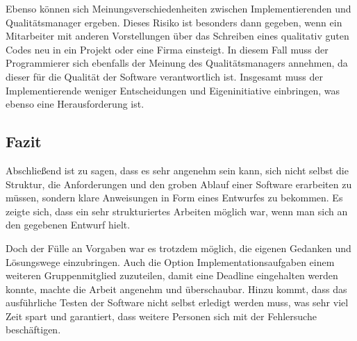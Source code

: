 Ebenso können sich Meinungsverschiedenheiten zwischen Implementierenden und Qualitätsmanager ergeben. Dieses Risiko ist besonders dann gegeben, wenn ein Mitarbeiter mit anderen Vorstellungen über das Schreiben eines qualitativ guten Codes neu in ein Projekt oder eine Firma einsteigt. In diesem Fall muss der Programmierer sich ebenfalls der Meinung des Qualitätsmanagers annehmen, da dieser für die Qualität der Software verantwortlich ist. Insgesamt muss der Implementierende weniger Entscheidungen und Eigeninitiative einbringen, was ebenso eine Herausforderung ist.

\subsection{Fazit}
Abschließend ist zu sagen, dass es sehr angenehm sein kann, sich nicht selbst die Struktur, die Anforderungen und den groben Ablauf einer Software erarbeiten zu müssen, sondern klare Anweisungen in Form eines Entwurfes zu bekommen. Es zeigte sich, dass ein sehr strukturiertes Arbeiten möglich war, wenn man sich an den gegebenen Entwurf hielt.

Doch der Fülle an Vorgaben war es trotzdem möglich, die eigenen Gedanken und Lösungswege einzubringen. Auch die Option Implementationsaufgaben einem weiteren Gruppenmitglied zuzuteilen, damit eine Deadline eingehalten werden konnte, machte die Arbeit angenehm und überschaubar. Hinzu kommt, dass das ausführliche Testen der Software nicht selbst erledigt werden muss, was sehr viel Zeit spart und garantiert, dass weitere Personen sich mit der Fehlersuche beschäftigen.

